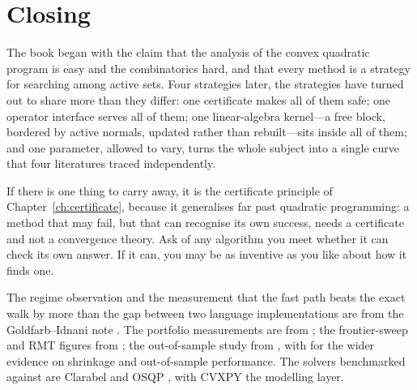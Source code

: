\section{Closing}

The book began with the claim that the analysis of the convex quadratic program is easy
and the combinatorics hard, and that every method is a strategy for searching among
active sets. Four strategies later, the strategies have turned out to share more than
they differ: one certificate makes all of them safe; one operator interface serves all
of them; one linear-algebra kernel---a free block, bordered by active normals, updated
rather than rebuilt---sits inside all of them; and one parameter, allowed to vary, turns
the whole subject into a single curve that four literatures traced independently.

If there is one thing to carry away, it is the certificate principle of
Chapter~\ref{ch:certificate}, because it generalises far past quadratic programming: a
method that may fail, but that can recognise its own success, needs a certificate and
not a convergence theory. Ask of any algorithm you meet whether it can check its own
answer. If it can, you may be as inventive as you like about how it finds one.

\begin{notes}
The regime observation and the measurement that the fast path beats the exact walk by
more than the gap between two language implementations are from the Goldfarb--Idnani note \cite{schmelzer2026quadprog}. The
portfolio measurements are from \cite{schmelzer2026matrixfree}; the frontier-sweep and
RMT figures from \cite{schmelzer2026rmt}; the out-of-sample study from
\cite{schmelzer2026matrixfree}, with \cite{demiguel2009} for the wider evidence on
shrinkage and out-of-sample performance. The solvers benchmarked against are Clarabel
\cite{clarabel2024} and OSQP \cite{osqp}, with CVXPY \cite{diamond2016} the modelling
layer.
\end{notes}

